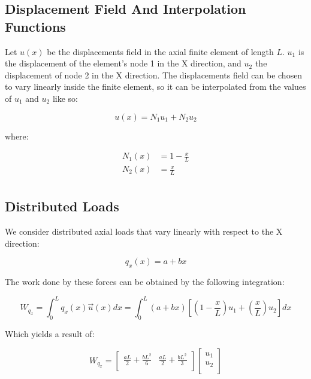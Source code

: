 \subsection{Displacement Field And Interpolation Functions}

Let $u(x)$ be the displacements field in the axial finite element of length $L$.
$u_1$ is the displacement of the element's node 1 in the X direction, and $u_2$ the displacement of node 2 in the X direction.
The displacements field can be chosen to vary linearly inside the finite element, so it can be interpolated from the values of $u_1$ and $u_2$ like so:

\begin{equation}
  u(x) = N_1 u_1 + N_2 u_2
\end{equation}

where:

\begin{equation}
  \begin{split}
    N_1(x) & = 1 - \frac{x}{L} \\
    N_2(x) & = \frac{x}{L} \\
  \end{split}
\end{equation}


\subsection{Distributed Loads}

We consider distributed axial loads that vary linearly with respect to the X direction:

\begin{equation}
  \label{eq:distributed_linear_load}
  q_x(x) = a + bx
\end{equation}

The work done by these forces can be obtained by the following integration:

\[
  W_{q_x} = \int_{0}^{L} q_x(x) \vec{u}(x) dx = \int_{0}^{L} (a + bx) \left[ \left( 1 - \frac{x}{L} \right) u_1 + \left( \frac{x}{L} \right) u_2 \right] dx
\]

Which yields a result of:

\[
  W_{q_x} =
  \begin{bmatrix}
    \frac{a L}{2} + \frac{b L^2}{6} & \frac{a L}{2} + \frac{b L^2}{3} \\
  \end{bmatrix}
  \begin{bmatrix}
    u_1 \\
    u_2 \\
  \end{bmatrix}
\]

